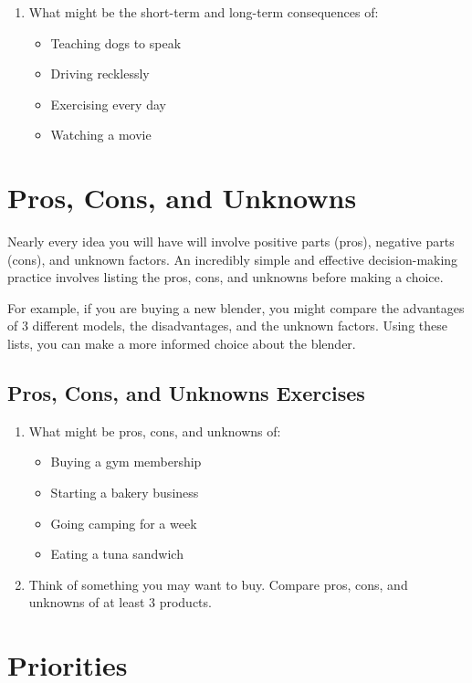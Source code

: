 \begin{enumerate}
	\item What might be the short-term and long-term consequences of:
	\begin{itemize}
		\item Teaching dogs to speak
		\item Driving recklessly
		\item Exercising every day
		\item Watching a movie
	\end{itemize}
\end{enumerate}


\chapter{Pros, Cons, and Unknowns}

Nearly every idea you will have will involve positive parts (pros), negative parts (cons), and unknown factors. An incredibly simple and effective decision-making practice involves listing the pros, cons, and unknowns before making a choice.

For example, if you are buying a new blender, you might compare the advantages of 3 different models, the disadvantages, and the unknown factors. Using these lists, you can make a more informed choice about the blender.

\section*{Pros, Cons, and Unknowns Exercises}

\begin{enumerate}
	\item What might be pros, cons, and unknowns of:
	\begin{itemize}
		\item Buying a gym membership
		\item Starting a bakery business
		\item Going camping for a week
		\item Eating a tuna sandwich
	\end{itemize}
	\item Think of something you may want to buy. Compare pros, cons, and unknowns of at least 3 products. 
\end{enumerate}


\chapter{Priorities}


